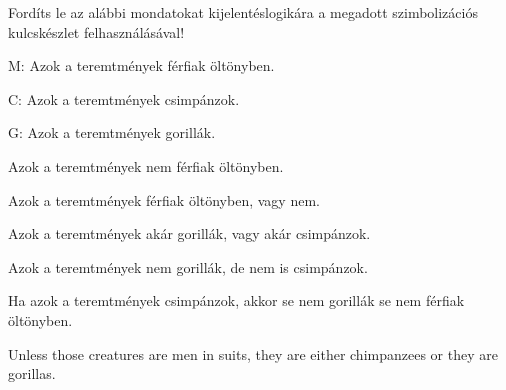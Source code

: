 \solutions
\problempart Fordíts le az alábbi mondatokat kijelentéslogikára a megadott szimbolizációs kulcskészlet felhasználásával!
\label{pr.monkeysuits}
\begin{ekey}
\item[M:] Azok a teremtmények férfiak öltönyben.
\item[C:] Azok a teremtmények csimpánzok.
\item[G:] Azok a teremtmények gorillák.
\end{ekey}
\begin{earg}
\item Azok a teremtmények nem férfiak öltönyben.
\item Azok a teremtmények férfiak öltönyben, vagy nem.
\item Azok a teremtmények akár gorillák, vagy akár csimpánzok.
\item Azok a teremtmények nem gorillák, de nem is csimpánzok.
\item Ha azok a teremtmények csimpánzok, akkor se nem gorillák se nem férfiak öltönyben.
\item Unless those creatures are men in suits, they are either chimpanzees or they are gorillas.
\end{earg}




